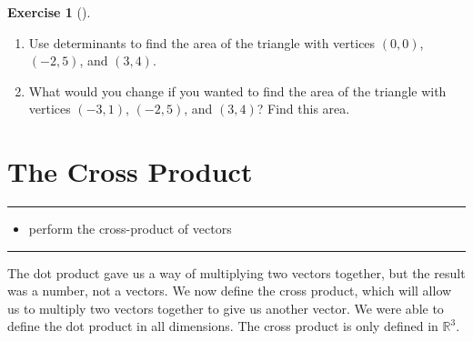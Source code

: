 \documentclass[10pt,]{book}
\theoremstyle{plain}
\theoremstyle{definition}
\theoremstyle{definition}
\theoremstyle{definition}
\theoremstyle{definition}
\newtheorem{exploration}[project]{Exercise}
\newenvironment{objectives}[1]{\noindent\rule{\linewidth}{0.1ex}\newline{\textbf{{\large#1}}\par\smallskip}}{\par\noindent\rule{\linewidth}{0.1ex}\par\smallskip}
\theoremstyle{definition}
\numberwithin{equation}{section}
\begin{document}
\begin{exploration}[]\label{exploration-40}
\leavevmode%
\begin{enumerate}[font=\bfseries,label=(\alph*),ref=\alph*]
\item\label{task-72} Use determinants to find the area of the triangle with vertices \((0,0)\), \((-2,5)\), and \((3,4)\).%
\item\label{task-73} What would you change if you wanted to find the area of the triangle with vertices \((-3,1)\), \((-2,5)\), and \((3,4)\)? Find this area.%
\end{enumerate}
\end{exploration}
\typeout{************************************************}
\typeout{************************************************}
\section[{The Cross Product}]{The Cross Product}\label{ch02_4_crossproduct}
\begin{objectives}{Objectives: Topical}\label{objectives-5}
%
\begin{itemize}[label=\textbullet]
\item{}perform the cross-product of vectors%
\end{itemize}
\end{objectives}
The dot product gave us a way of multiplying two vectors together, but the result was a number, not a vectors. We now define the cross product, which will allow us to multiply two vectors together to give us another vector. We were able to define the dot product in all dimensions. The cross product is only defined in \(\mathbb{R}^3\).%
\end{document}
